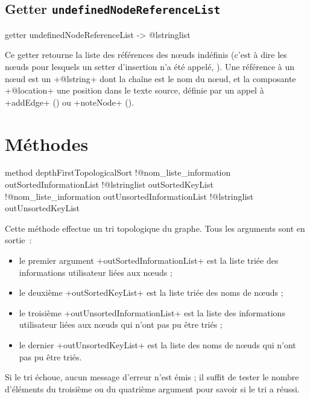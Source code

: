 \subsection{Getter \texttt{undefinedNodeReferenceList}}

\begin{galgas}
getter undefinedNodeReferenceList -> @lstringlist 
\end{galgas}

Ce getter retourne la liste des références des nœuds indéfinis (c'est à dire les nœuds pour lesquels un setter d'insertion n'a été appelé, ). Une référence à un nœud est un \ggs+@lstring+ dont la chaîne est le nom du nœud, et la composante \ggs+@location+ une position dans le texte source, définie par un appel à \ggs+addEdge+ () ou \ggs+noteNode+ ().




\section{Méthodes}


\begin{galgas}
method depthFirstTopologicalSort
  !@nom_liste_information outSortedInformationList
  !@lstringlist outSortedKeyList
  !@nom_liste_information outUnsortedInformationList
  !@lstringlist outUnsortedKeyList
\end{galgas}

Cette méthode effectue un tri topologique du graphe. Tous les arguments sont en sortie~:
\begin{itemize}
  \item le premier argument \ggs+outSortedInformationList+ est la liste triée des informations utilisateur liées aux nœuds ;
  \item le deuxième \ggs+outSortedKeyList+ est la liste triée des noms de nœuds ;
  \item le troisième \ggs+outUnsortedInformationList+ est la liste des informations utilisateur liées aux nœuds qui n'ont pas pu être triés ;
  \item le dernier \ggs+outUnsortedKeyList+ est la liste des noms de nœuds qui n'ont pas pu être triés.
\end{itemize}

Si le tri échoue, aucun message d'erreur n'est émis ; il suffit de tester le nombre d'éléments du troisième ou du quatrième argument pour savoir si le tri a réussi.

